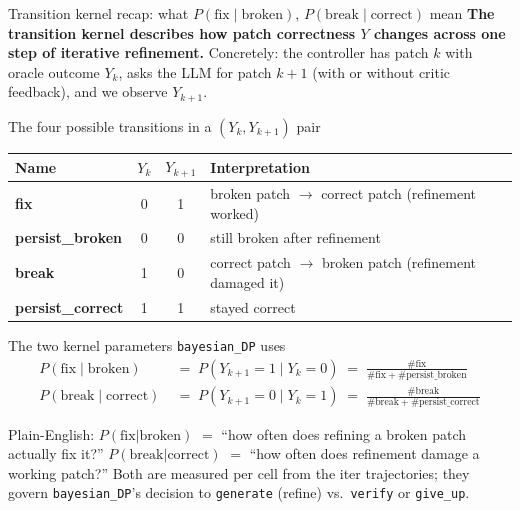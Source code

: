 \documentclass[10pt]{beamer}
\newcommand{\good}[1]{\textcolor{accentGreen}{\textbf{#1}}}
\newcommand{\bad}[1]{\textcolor{accentRed}{\textbf{#1}}}
\newcommand{\warn}[1]{\textcolor{accentOrange}{\textbf{#1}}}
\newcommand{\info}[1]{\textcolor{primaryBlue}{\textbf{#1}}}
\begin{document}
\begin{frame}{Transition kernel recap: what $P(\text{fix}\mid\text{broken})$, $P(\text{break}\mid\text{correct})$ mean}
\info{The transition kernel describes how patch correctness $Y$ changes
across one step of iterative refinement.} Concretely: the controller has
patch $k$ with oracle outcome $Y_k$, asks the LLM for patch $k{+}1$ (with
or without critic feedback), and we observe $Y_{k+1}$.

\vspace{0.1cm}
\begin{block}{The four possible transitions in a $(Y_k, Y_{k+1})$ pair}
\centering
\begin{tabular}{lccp{5.5cm}}
\toprule
\rowcolor{paleBlue}\textbf{Name} & $Y_k$ & $Y_{k+1}$ & \textbf{Interpretation} \\
\midrule
\rowcolor{paleGreen}\good{fix}            & 0 & 1 & broken patch $\to$ correct patch (refinement worked) \\
\warn{persist\_broken}                    & 0 & 0 & still broken after refinement \\
\bad{break}                                & 1 & 0 & correct patch $\to$ broken patch (refinement damaged it) \\
\good{persist\_correct}                   & 1 & 1 & stayed correct \\
\bottomrule
\end{tabular}
\end{block}

\vspace{0.05cm}
\begin{block}{The two kernel parameters \texttt{bayesian\_DP} uses}
\footnotesize
\vspace{-0.15cm}
\begin{align*}
P(\text{fix}\mid\text{broken})\;\; &=\; P(Y_{k+1}{=}1 \mid Y_k{=}0)\; =\; \tfrac{\#\text{fix}}{\#\text{fix}+\#\text{persist\_broken}}\\
P(\text{break}\mid\text{correct})\; &=\; P(Y_{k+1}{=}0 \mid Y_k{=}1)\; =\; \tfrac{\#\text{break}}{\#\text{break}+\#\text{persist\_correct}}
\end{align*}
\vspace{-0.5cm}
\end{block}

\textcolor{softGrey}{\scriptsize Plain-English: \good{$P(\text{fix}|\text{broken})$}
$=$ ``how often does refining a broken patch actually fix it?'' \quad
\bad{$P(\text{break}|\text{correct})$} $=$ ``how often does refinement
damage a working patch?'' \quad Both are measured per cell from the iter
trajectories; they govern \texttt{bayesian\_DP}'s decision to \texttt{generate}
(refine) vs.\ \texttt{verify} or \texttt{give\_up}.}
\end{frame}
\end{document}
